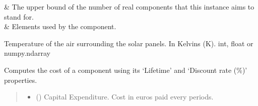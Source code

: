 \documentclass[letterpaper,10pt,english]{sphinxmanual}
\begin{document}
\begin{fulllineitems}
\begin{savenotes}
\begin{tabulary}{\linewidth}[t]{}
&
\sphinxAtStartPar
The upper bound of the number of real components that this instance aims to stand for.
\\
\hline
\sphinxAtStartPar
{\hyperref[\detokenize{generated/tamos.production.FPSolar:tamos.production.FPSolar.used_elements}]{}}
&
\sphinxAtStartPar
Elements used by the component.
\\
\hline
\end{tabulary}
\par
\sphinxattableend\end{savenotes}

\begin{fulllineitems}
\label{\detokenize{generated/tamos.production.FPSolar:tamos.production.FPSolar.air_temperature}}
\pysigstartsignatures
{}
\pysigstopsignatures
\sphinxAtStartPar
Temperature of the air surrounding the solar panels.
In Kelvins (K).
int, float or numpy.ndarray

\end{fulllineitems}


\begin{fulllineitems}
\label{\detokenize{generated/tamos.production.FPSolar:tamos.production.FPSolar.compute_actualized_cost}}
\pysigstartsignatures
{}
\pysigstopsignatures
\sphinxAtStartPar
Computes the cost of a component using its ‘Lifetime’ and ‘Discount rate (\%)’ properties.
\begin{quote}\begin{description}
\begin{itemize}
\item {} 
\sphinxAtStartPar
{} () \textendash{} Capital Expenditure. Cost in euros paid every  periods.


\end{itemize}
\end{description}
\end{quote}
\end{fulllineitems}
\end{fulllineitems}
\end{document}
